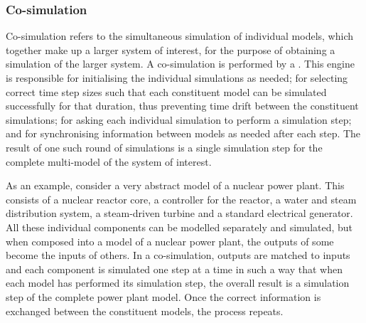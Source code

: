 \subsubsection{Co-simulation}
\label{sec:concepts:cosim}
Co-simulation refers to the simultaneous simulation of individual models, which together make up a larger system of interest, for the purpose of obtaining a simulation of the larger system.
A co-simulation is performed by a .
This engine is responsible for initialising the individual simulations as needed;  for selecting correct time step sizes such that each constituent model can be simulated successfully for that duration, thus preventing time drift between the constituent simulations;  for asking each individual simulation to perform a simulation step;  and for synchronising information between models as needed after each step.
The result of one such round of simulations is a single simulation step for the complete multi-model of the system of interest.

As an example, consider a very abstract model of a nuclear power plant.
This consists of a nuclear reactor core, a controller for the reactor, a water and steam distribution system, a steam-driven turbine and a standard electrical generator.
All these individual components can be modelled separately and simulated, but when composed into a model of a nuclear power plant, the outputs of some become the inputs of others.
In a co-simulation, outputs are matched to inputs and each component is simulated one step at a time in such a way that when each model has performed its simulation step, the overall result is a simulation step of the complete power plant model.
Once the correct information is exchanged between the constituent models, the process repeats.

